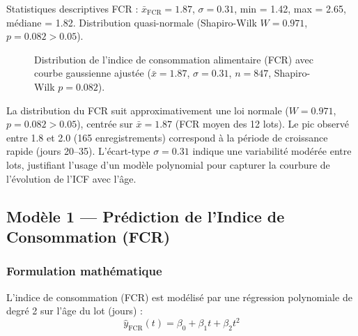 Statistiques descriptives FCR :
$\bar{x}_\text{FCR} = 1.87$, $\sigma = 0.31$, min = 1.42, max = 2.65,
médiane = 1.82. Distribution quasi-normale (Shapiro-Wilk $W = 0.971$,
$p = 0.082 > 0.05$).

\begin{figure}[H]
\centering
{}
\caption[Distribution de l'indice FCR]{Distribution de l'indice de consommation alimentaire (FCR) avec courbe gaussienne
ajustée ($\bar{x}=1.87$, $\sigma=0.31$, $n=847$, Shapiro-Wilk $p=0.082$).}
\label{fig:fcr_hist}
\end{figure}

\noindent
La distribution du FCR suit approximativement une loi normale
($W = 0.971$, $p = 0.082 > 0.05$), centrée sur $\bar{x} = 1.87$ (FCR moyen
des 12 lots). Le pic observé entre 1.8 et 2.0 (165 enregistrements) correspond
à la période de croissance rapide (jours 20--35). L'écart-type $\sigma = 0.31$
indique une variabilité modérée entre lots, justifiant l'usage d'un modèle
polynomial pour capturer la courbure de l'évolution de l'ICF avec l'âge.

\subsection{Modèle 1 --- Prédiction de l'Indice de Consommation (FCR)}

\subsubsection{Formulation mathématique}

L'indice de consommation (FCR) est modélisé par une régression polynomiale
de degré 2 sur l'âge du lot (jours) :
\begin{equation}
\hat{y}_\text{FCR}(t) = \beta_0 + \beta_1 t + \beta_2 t^2
\label{eq:fcr_poly}
\end{equation}

